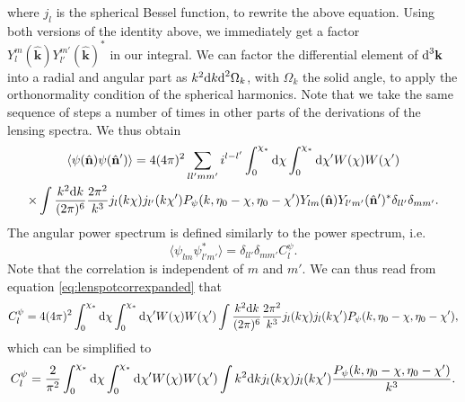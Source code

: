 \documentclass[11pt]{article} %
\DeclareRobustCommand{\d}{\ifmmode\text{d}\else d\fi}
\begin{document}
where $j_l$ is the spherical Bessel function, to rewrite the above equation. Using both versions of the identity above, we immediately get a factor $Y_l^m(\hat{\mathbf k})Y_{l'}^{m'}(\hat{\mathbf k})^*$ in our integral. We can factor the differential element of $\d^3\mathbf k$ into a radial and angular part as $k^2\d k\d^2\Omega_k$, with $\Omega_k$ the solid angle, to apply the orthonormality condition of the spherical harmonics. Note that we take the same sequence of steps a number of times in other parts of the derivations of the lensing spectra. We thus obtain
\begin{gather}
    \langle \psi(\hat{\mathbf n})\psi(\hat{\mathbf n}') \rangle = 4(4\pi)^2\sum_{ll'mm'}i^{l-l'}\int_0^{\chi_*}\d \chi\int_0^{\chi_*}\d \chi' W(\chi)W(\chi')\\\times\int \frac{k^2\d k}{(2\pi)^6}\frac{2\pi^2}{k^3}j_l(k\chi)j_{l'}(k\chi')P_\psi(k,\eta_0 - \chi, \eta_0-\chi')Y_{lm}(\hat{\mathbf n})Y_{l'm'}(\hat{\mathbf n}')^*\delta_{ll'}\delta_{mm'}. \label{eq:lenspotcorrexpanded}
\end{gather}
The angular power spectrum is defined similarly to the power spectrum, i.e.
\begin{equation}
    \langle \psi_{lm}\psi_{l'm'}^* \rangle = \delta_{ll'}\delta_{mm'}C_l^\psi.
\end{equation}
Note that the correlation is independent of $m$ and $m'$. %
We can thus read from equation \ref{eq:lenspotcorrexpanded} that
\begin{gather}
    C_l^\psi = 4(4\pi)^2\int_0^{\chi_*}\d \chi\int_0^{\chi_*}\d \chi' W(\chi)W(\chi')\int \frac{k^2\d k}{(2\pi)^6}\frac{2\pi^2}{k^3}j_l(k\chi)j_{l}(k\chi')P_\psi(k,\eta_0 - \chi, \eta_0-\chi'),
\end{gather}
which can be simplified to
\begin{gather}
    C_l^\psi = \frac{2}{\pi^2}\int_0^{\chi_*}\d \chi\int_0^{\chi_*}\d \chi' W(\chi)W(\chi')\int k^2\d kj_l(k\chi)j_{l}(k\chi')\frac{P_\psi(k,\eta_0 - \chi, \eta_0-\chi')}{k^3}.
\end{gather}
\end{document}
